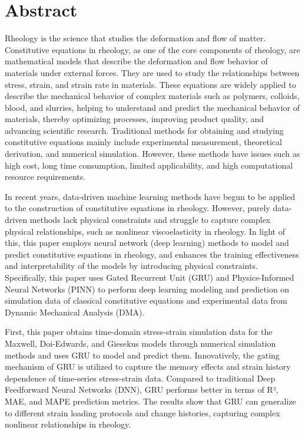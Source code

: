 \chapter{Abstract}
Rheology is the science that studies the deformation and flow of matter. Constitutive equations in rheology, as one of the core components of rheology, are mathematical models that describe the deformation and flow behavior of materials under external forces. They are used to study the relationships between stress, strain, and strain rate in materials. These equations are widely applied to describe the mechanical behavior of complex materials such as polymers, colloids, blood, and slurries, helping to understand and predict the mechanical behavior of materials, thereby optimizing processes, improving product quality, and advancing scientific research. Traditional methods for obtaining and studying constitutive equations mainly include experimental measurement, theoretical derivation, and numerical simulation. However, these methods have issues such as high cost, long time consumption, limited applicability, and high computational resource requirements.

In recent years, data-driven machine learning methods have begun to be applied to the construction of constitutive equations in rheology. However, purely data-driven methods lack physical constraints and struggle to capture complex physical relationships, such as nonlinear viscoelasticity in rheology. In light of this, this paper employs neural network (deep learning) methods to model and predict constitutive equations in rheology, and enhances the training effectiveness and interpretability of the models by introducing physical constraints. Specifically, this paper uses Gated Recurrent Unit (GRU) and Physics-Informed Neural Networks (PINN) to perform deep learning modeling and prediction on simulation data of classical constitutive equations and experimental data from Dynamic Mechanical Analysis (DMA).

First, this paper obtains time-domain stress-strain simulation data for the Maxwell, Doi-Edwards, and Giesekus models through numerical simulation methods and uses GRU to model and predict them. Innovatively, the gating mechanism of GRU is utilized to capture the memory effects and strain history dependence of time-series stress-strain data. Compared to traditional Deep Feedforward Neural Networks (DNN), GRU performs better in terms of R², MAE, and MAPE prediction metrics. The results show that GRU can generalize to different strain loading protocols and change histories, capturing complex nonlinear relationships in rheology.

